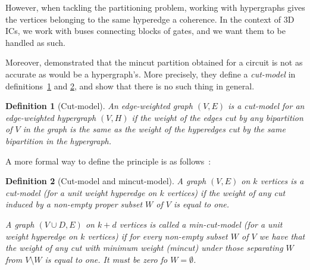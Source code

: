 \documentclass[12pt,a4paper]{article}
\theoremstyle{customdef}
\newtheorem{definition}{Definition}
\begin{document}
However, when tackling the partitioning problem, working with hypergraphs gives the vertices belonging to the same hyperedge a coherence.
In the context of 3D ICs, we work with buses connecting blocks of gates, and we want them to be handled as such.

Moreover, \citet{Ihler1993} demonstrated that the mincut partition obtained for a circuit is not as accurate as would be a hypergraph's.
More precisely, they define a \textit{cut-model} in definitions~\ref{def:cut-model} and \ref{def:cut-model-formal}, and show that there is no such thing in general.

\begin{definition}[Cut-model]\label{def:cut-model}
An edge-weighted graph $(V,E)$ is a cut-model for an edge-weighted hypergraph $(V,H)$ if the weight of the edges cut by any bipartition of $V$ in the graph is the same as the weight of the hyperedges cut by the same bipartition in the hypergraph.
\end{definition}

A more formal way to define the principle is as follows~:
\begin{definition}[Cut-model and mincut-model]\label{def:cut-model-formal}
A graph $(V, E)$ on $k$ vertices is a cut-model (for a unit weight hyperedge on $k$ vertices) if the weight of any cut induced by a non-empty proper subset $W$ of $V$ is equal to one.

A graph $(V \cup D,E)$ on $k+d$ vertices is called a min-cut-model (for a unit weight hyperedge on $k$ vertices) if for every non-empty subset $W$ of $V$ we have that the weight of any cut with minimum weight (mincut) under those separating $W$ from $V \setminus W$ is equal to one.
It must be zero fo $W=\emptyset$.%
\end{definition}






\end{document}
